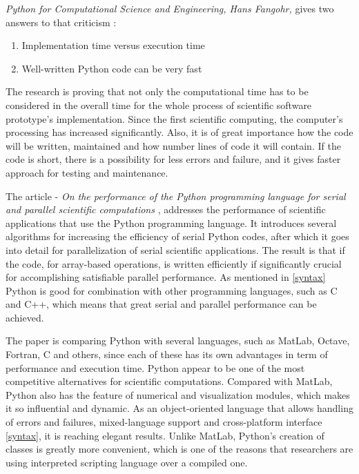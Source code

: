 \textit{Python for Computational Science and Engineering, Hans Fangohr,} gives two answers to that criticism \cite{HansPython}:
\begin{enumerate}
\item Implementation time versus execution time
\item Well-written Python code can be very fast
\end{enumerate}

The research is proving that not only the computational time has to be considered in the overall time for the whole process of scientific software prototype's implementation. Since the first scientific computing, the computer's processing has increased significantly. Also, it is of great importance how the code will be written, maintained and how number lines of code it will contain. If the code is short, there is a possibility for less errors and failure, and it gives faster approach for testing and maintenance. 

The article - \textit{On the performance of the Python programming language for serial and parallel scientific computations} \cite{cai2005performance}, addresses the performance of scientific applications that use the Python programming language. It introduces several algorithms for increasing the efficiency of serial Python codes, after which it goes into detail for parallelization of serial scientific applications. The result is that if the code, for array-based operations, is written efficiently if significantly crucial for accomplishing satisfiable parallel performance. As mentioned in \ref{syntax} Python is good for combination with other programming languages, such as C and C++, which means that great serial and parallel performance can be achieved. 

The paper \cite{cai2005performance} is comparing Python with several languages, such as MatLab, Octave, Fortran, C and others, since each of these has its own advantages in term of performance and execution time. Python appear to be one of the most competitive alternatives for scientific computations. Compared with MatLab, Python also has the feature of numerical and visualization modules, which makes it so influential and dynamic. As an object-oriented language that allows handling of errors and failures, mixed-language support and cross-platform interface \ref{syntax}, it is reaching elegant results. Unlike MatLab, Python's creation of classes is greatly more convenient, which is one of the reasons that researchers are using interpreted scripting language over a compiled one.

